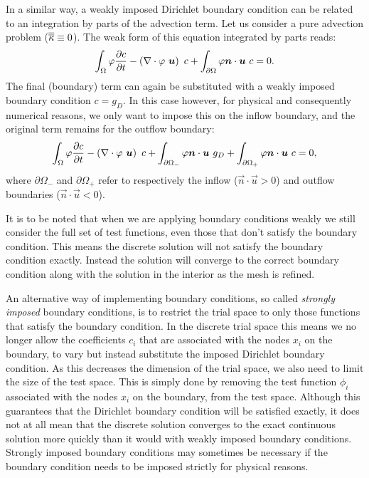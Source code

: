 In a similar way, a weakly imposed Dirichlet boundary condition can be related to an
integration by parts of the advection term. Let us consider a pure advection problem
($\overline{\overline{\kappa}}\equiv 0$). The weak form of this equation integrated by parts reads:
\begin{equation*}
  \int_\Omega \varphi \frac{\partial c}{\partial t} -
    \left(\nabla\cdot \varphi~{\mbox{\boldmath$u$}}\right)~c +
    \int_{\partial\Omega} \varphi {\mbox{\boldmath$n$}}\cdot{\mbox{\boldmath$u$}}~c
    = 0.
\end{equation*}
The final (boundary) term can again be substituted with a weakly imposed
boundary condition $c=g_D$.  In this case however, for physical and consequently numerical reasons, we only want to impose
this on the inflow boundary, and the original term remains for the outflow
boundary:
\begin{equation}\label{eq:adv_integrated_by_parts}
  \int_\Omega \varphi \frac{\partial c}{\partial t} -
    \left(\nabla\cdot \varphi~{\mbox{\boldmath$u$}}\right)~c +
    \int_{\partial\Omega_-} \varphi{\mbox{\boldmath$n$}}\cdot{\mbox{\boldmath$u$}}~g_D +
    \int_{\partial\Omega_+} \varphi{\mbox{\boldmath$n$}}\cdot{\mbox{\boldmath$u$}}~c
    = 0,
\end{equation}
where $\partial\Omega_-$ and $\partial\Omega_+$ refer to respectively
the inflow ($\vec{n}\cdot\vec{u}>0$) and outflow boundaries ($\vec{n}\cdot\vec{u}<0$).

It is to be noted that when we are applying boundary conditions weakly we
still consider the full set of test functions, even those that don't satisfy
the boundary condition. This means the discrete solution will not satisfy
the boundary condition exactly. Instead the solution will converge to the
correct boundary condition along with the solution in the interior as the mesh
is refined.

 An alternative way of
implementing boundary conditions, so called \emph{strongly imposed} boundary
conditions, is to restrict the trial space to only those functions that
satisfy the boundary condition. In the discrete trial space this means we no
longer allow the coefficients $c_i$ that are associated with the nodes $x_i$
on the boundary, to vary but instead substitute the imposed Dirichlet
boundary condition. As this decreases the dimension of the trial space, we
also need to limit the size of the test space. This is simply done by
removing the test function $\phi_i$ associated with the nodes $x_i$ on the
boundary, from the test space. Although this guarantees that the Dirichlet
boundary condition will be satisfied exactly, it does not at all mean that
the discrete solution converges to the exact continuous solution more
quickly than it would with weakly imposed boundary conditions. Strongly
imposed boundary conditions may sometimes be necessary if the boundary
condition needs to be imposed strictly for physical reasons.

